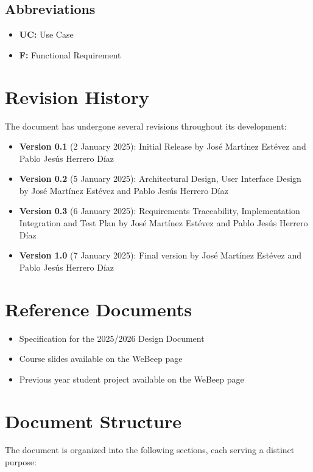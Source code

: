 \subsection{Abbreviations}
\label{subsec:abbreviations}%
\begin{itemize}
    \item \textbf{UC:} Use Case
    \item \textbf{F:} Functional Requirement
\end{itemize}

\section{Revision History}
\label{sec:revision_history}

The document has undergone several revisions throughout its development:

\begin{itemize}
    \item \textbf{Version 0.1} (2 January 2025): Initial Release by José Martínez Estévez and Pablo Jesús Herrero Díaz
    \item \textbf{Version 0.2} (5 January 2025): Architectural Design, User Interface Design by José Martínez Estévez and Pablo Jesús Herrero Díaz
    \item \textbf{Version 0.3} (6 January 2025): Requirements Traceability, Implementation Integration and Test Plan by José Martínez Estévez and Pablo Jesús Herrero Díaz
    \item \textbf{Version 1.0} (7 January 2025): Final version by José Martínez Estévez and Pablo Jesús Herrero Díaz
\end{itemize}


\section{Reference Documents}
\label{sec:reference_documents}%

\begin{itemize}
    \item Specification for the 2025/2026 Design Document
    \item Course slides available on the WeBeep page 
    \item Previous year student project available on the WeBeep page
\end{itemize}

\section{Document Structure}
\label{sec:document_structure}%
The document is organized into the following sections, each serving a distinct purpose:

